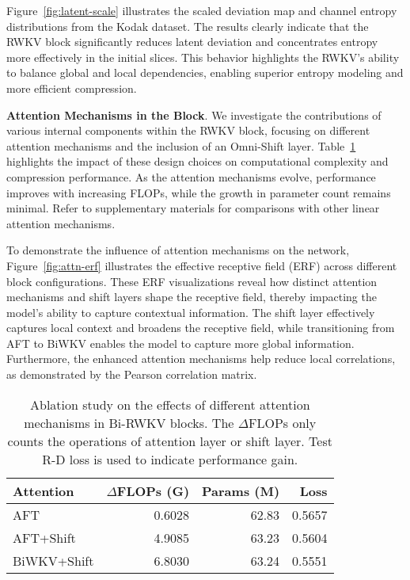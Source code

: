 Figure~\ref{fig:latent-scale} illustrates the scaled deviation map and channel entropy distributions from the Kodak dataset. The results clearly indicate that the RWKV block significantly reduces latent deviation and concentrates entropy more effectively in the initial slices. This behavior highlights the RWKV's ability to balance global and local dependencies, enabling superior entropy modeling and more efficient compression.

\noindent\textbf{Attention Mechanisms in the Block}. We investigate the contributions of various internal components within the RWKV block, focusing on different attention mechanisms and the inclusion of an Omni-Shift layer. Table~\ref{tab:block-component} highlights the impact of these design choices on computational complexity and compression performance. As the attention mechanisms evolve, performance improves with increasing FLOPs, while the growth in parameter count remains minimal. Refer to supplementary materials for comparisons with other linear attention mechanisms.


To demonstrate the influence of attention mechanisms on the network, Figure~\ref{fig:attn-erf} illustrates the effective receptive field (ERF) across different block configurations. These ERF visualizations reveal how distinct attention mechanisms and shift layers shape the receptive field, thereby impacting the model’s ability to capture contextual information. The shift layer effectively captures local context and broadens the receptive field, while transitioning from AFT to BiWKV enables the model to capture more global information. Furthermore, the enhanced attention mechanisms help reduce local correlations, as demonstrated by the Pearson correlation matrix.



\begin{table}[h!]
\centering
\begin{tabular}{@{}lrrr@{}}
\toprule
Attention              & $\Delta$FLOPs (G) & Params (M) & Loss   \\ \midrule
AFT         & 0.6028   & 62.83     & 0.5657 \\
AFT+Shift   & 4.9085   & 63.23     & 0.5604 \\
BiWKV+Shift & 6.8030   & 63.24     & 0.5551 \\ \bottomrule
\end{tabular}
\caption{Ablation study on the effects of different attention mechanisms in Bi-RWKV blocks. The $\Delta$FLOPs only counts the operations of attention layer or shift layer. Test R-D loss is used to indicate performance gain. %
}
\label{tab:block-component}
\end{table}











